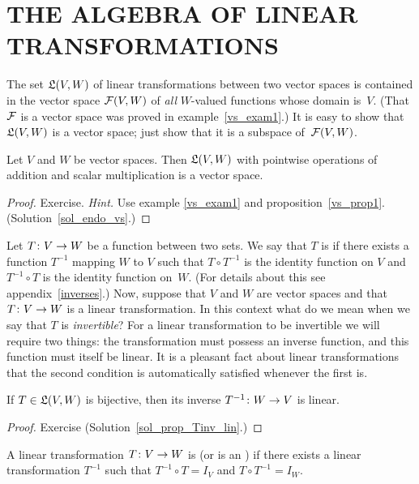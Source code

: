 \section{THE ALGEBRA OF LINEAR TRANSFORMATIONS}  The set $\mathfrak{L}(V,W)$ of linear transformations
between two vector spaces is contained in the vector space $\mathcal{F}(V,W)$ of \emph{all}
$W$-valued functions whose domain is~$V$.  (That $\mathcal{F}$ is a vector space was proved in
example~\ref{vs_exam1}.)  It is easy to show that $\mathfrak{L}(V,W)$ is a vector space; just show
that it is a subspace of~$\mathcal{F}(V,W)$.

\begin{prop}\label{endo_vs}  Let $V$ and $W$ be vector spaces. Then $\mathfrak{L}(V,W)$ with pointwise
operations of addition and scalar multiplication is a vector space.
\end{prop}

\begin{proof} Exercise. \emph{Hint.}  Use example \ref{vs_exam1} and proposition~\ref{vs_prop1}.
(Solution~\ref{sol_endo_vs}.)   \ns
\end{proof}

Let $T \colon V \rightarrow W$ be a function between two sets.  We say that $T$ is
 if there exists a function $T^{-1}$ mapping $W$ to $V$ such that $T \circ
T^{-1}$ is the identity function on $V$ and $T^{-1} \circ T$ is the identity function on~$W$.
(For details about this see appendix~\ref{inverses}.)   Now, suppose that $V$ and $W$ are
vector spaces and that $T \colon V\rightarrow W$ is a linear transformation.  In this context what do
we mean when we say that $T$ is \emph{invertible}?  For a linear transformation to be
invertible we will require two things: the transformation must possess an inverse function,
and this function must itself be linear. It is a pleasant fact about linear transformations
that the second condition is automatically satisfied whenever the first is.

\begin{prop}\label{prop_Tinv_lin} If $T \in \mathfrak{L}(V,W)$ is bijective, then its inverse
$T^{-1} \colon W \rightarrow V$ is linear.
\end{prop}

\begin{proof} Exercise   (Solution~\ref{sol_prop_Tinv_lin}.) \ns    \end{proof}

\begin{defn}
A linear transformation $T \colon V \rightarrow W$ is
 (or is an
) if there exists a linear transformation $T^{-1}$ such that $T^{-1}\circ T =
I_V$ and $T \circ T^{-1} = I_W$.
\end{defn}

